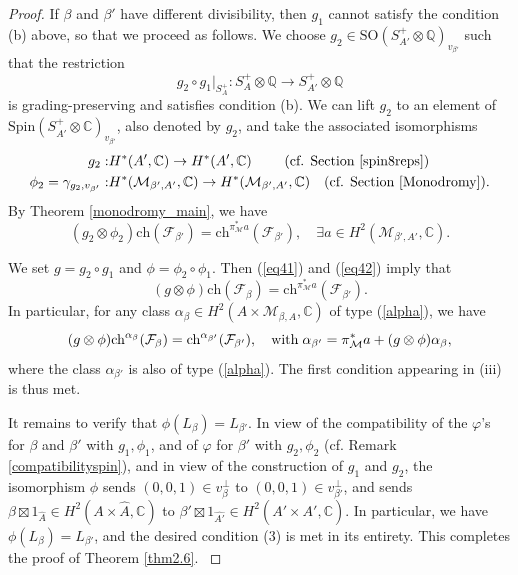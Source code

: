 \documentclass[11pt]{amsart}
\theoremstyle{plain}
\theoremstyle{definition}
\theoremstyle{remark}
\newcommand{\BC}{{\mathbb{C}}}
\newcommand{\BQ}{{\mathbb{Q}}}
\newcommand{\CF}{{\mathcal F}}
\newcommand{\CM}{{\mathcal M}}
\begin{document}
\begin{proof}
If $\beta$ and $\beta'$ have different divisibility, then $g_1$ {cannot satisfy the condition (b) above}, so that  we proceed as follows.
We choose $g_2 \in \mathrm{SO}(S_{A'}^+\otimes {\BQ})_{v_{\beta'}}$ such that the restriction
$$g_2\circ g_1|_{S_{A}^{+}}: S_{A}^{+} \otimes {\BQ} \rightarrow S_{A'}^{+}\otimes {\BQ}$$
is grading-preserving and satisfies condition (b).
We can lift $g_2$ to an element of
$\mathrm{Spin}(S_{A'}^{+}\otimes \BC)_{v_{\beta'}}$, also denoted by $g_2$, and take the associated isomorphisms
\[
\begin{split}
 g_2: &  H^*(A',\BC)  \rightarrow H^*(A',\BC) \qquad \mbox{ (cf. Section \ref{spin8reps})}
\\
\phi_2=  \gamma_{g_2,v_{\beta'}}: &   H^*(\CM_{\beta',A'},\BC)  \rightarrow H^*(\CM_{\beta',A'},\BC)
\quad
\mbox{(cf. Section \ref{Monodromy})}.
\end{split}
\]
By Theorem \ref{monodromy_main}, we have
\begin{equation}\label{eq42}
(g_2 \otimes \phi_2) \mathrm{ch}(\CF_{\beta'}) =  \mathrm{ch}^{\pi_\CM^*a}(\CF_{\beta'}), \quad {\exists} a \in H^2(\CM_{\beta',A'}, \BC).
\end{equation}

We set $g = g_2 \circ g_1$ and $\phi = \phi_2\circ \phi_1$.
Then  (\ref{eq41}) and (\ref{eq42}) imply that
\[
(g\otimes \phi)\mathrm{ch}(\CF_{\beta}) = \mathrm{ch}^{\pi_\CM^*a}(\CF_{\beta'}).
\]
In particular, for any class $\alpha_\beta \in H^2(A\times \CM_{\beta,A}, \BC)$ of type (\ref{alpha}), we have
\[
(g\otimes \phi)\mathrm{ch}^{\alpha_\beta}(\CF_{\beta}) = \mathrm{ch}^{\alpha_{\beta'}}(\CF_{\beta'}), \quad {\rm with}\; \alpha_{\beta'} = \pi_\CM^*a+ (g\otimes \phi)\alpha_\beta,
\]
where the class $\alpha_{\beta'}$ is also of type (\ref{alpha}). {The first condition appearing in (iii) is thus met.}

{It remains to verify that $\phi (L_\beta)=L_{\beta'}$.
In view of  the compatibility of the $\varphi$'s for $\beta$ and $\beta'$ with $g_1, \phi_1$, and of $\varphi$ for $\beta'$ with $g_2, \phi_2$ (cf. Remark \ref{compatibilityspin}), and in view  of the construction of $g_1$ and $g_2$, 
the isomorphism $\phi$  sends $(0,0,1) \in v_\beta^\perp$ to $(0,0,1) \in v_{\beta'}^\perp$, and sends $\beta\boxtimes 1_{\hat{A}} \in H^2(A\times \hat{A}, \BC)$ to $\beta' \boxtimes 1_{\hat{A'}} \in H^2(A'\times \hat{A'}, \BC)$. In particular, we have
$
\phi(L_\beta) = L_{\beta'}
$, and the desired condition (3) is met in its entirety.
This completes the proof of Theorem \ref{thm2.6}. }
\end{proof}
\end{document}
